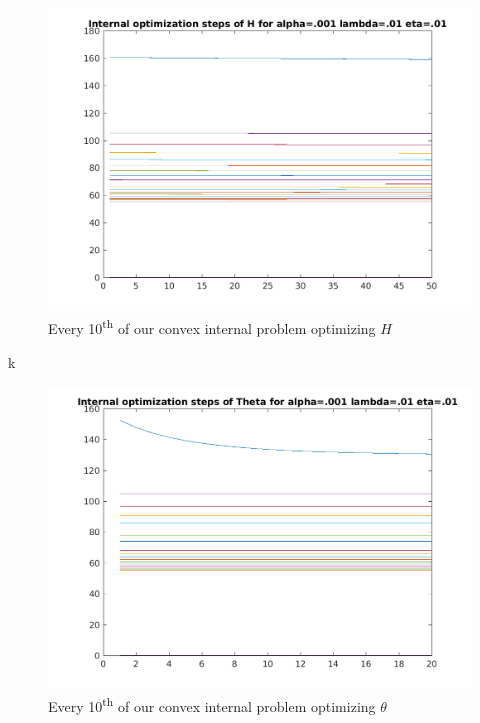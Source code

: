 \documentclass{article}
\newcommand{\0}{\mathrm{0}}
\newcommand{\1}{\mathrm{1}}
\begin{document}
\begin{figure}
  \includegraphics[width=\textwidth]{fixed-step-internal-H.png}
  \caption{Every 10\textsuperscript{th} of our convex internal problem optimizing $H$}
\end{figure}

k\begin{figure}
  \includegraphics[width=\textwidth]{fixed-step-internal-Th.png}
  \caption{Every 10\textsuperscript{th} of our convex internal problem optimizing $\theta$}
\end{figure}
\end{document}
